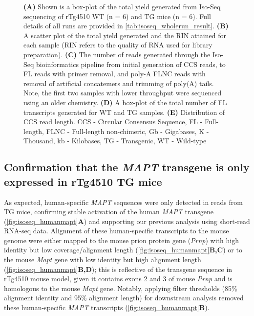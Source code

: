 \begin{figure}[p]
	\captionsetup{width=0.95\textwidth}
	\caption*{\textbf{(A)} Shown is a box-plot of the total yield generated from Iso-Seq sequencing of rTg4510 WT (n = 6) and TG mice (n = 6). Full details of all runs are provided in \cref{tab:isoseq_wholerun_result}. \textbf{(B)} A scatter plot of the total yield generated and the RIN attained for each sample (RIN refers to the quality of RNA used for library preparation). \textbf{(C)} The number of reads generated through the Iso-Seq bioinformatics pipeline from initial generation of CCS reads, to FL reads with primer removal, and poly-A FLNC reads with removal of artificial concatemers and trimming of poly(A) tails. Note, the first two samples with lower throughput were sequenced using an older chemistry. \textbf{(D)} A box-plot of the total number of FL transcripts generated for WT and TG samples. \textbf{(E)} Distribution of CCS read length. CCS - Circular Consensus Sequence, FL - Full-length, FLNC - Full-length non-chimeric, Gb - Gigabases, K - Thousand, kb - Kilobases, TG - Transgenic, WT - Wild-type}%
\end{figure}


\subsection{Confirmation that the \textit{MAPT} transgene is only expressed in rTg4510 TG mice}
\label{mapt_transgene_whole}
As expected, human-specific \textit{MAPT} sequences were only detected in reads from TG mice, confirming stable activation of the human \textit{MAPT} transgene (\cref{fig:isoseq_humanmapt}\textbf{A}) and supporting our previous analysis using short-read RNA-seq data\cite{Castanho2020}. Alignment of these human-specific transcripts to the mouse genome were either mapped to the mouse prion protein gene (\textit{Prnp}) with high identity but low coverage/alignment length (\cref{fig:isoseq_humanmapt}\textbf{B,C}) or to the mouse \textit{Mapt} gene with low identity but high alignment length (\cref{fig:isoseq_humanmapt}\textbf{B,D}); this is reflective of the transgene sequence in rTg4510 mouse model, given it contains exons 2 and 3 of mouse \textit{Prnp}\cite{Ramsden2005} and is homologous to the mouse \textit{Mapt} gene. Notably, applying filter thresholds (85\% alignment identity and 95\% alignment length) for downstream analysis removed these human-specific \textit{MAPT} transcripts (\cref{fig:isoseq_humanmapt}\textbf{B}). 

